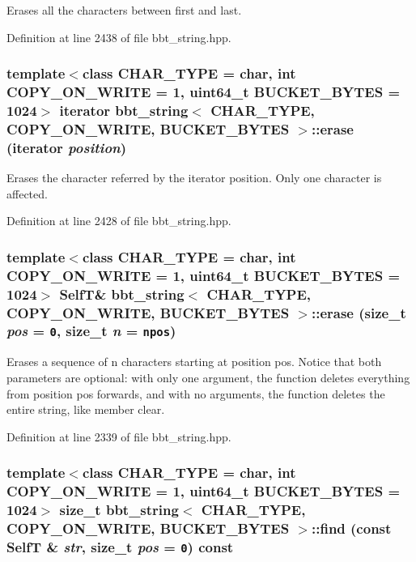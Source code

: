 Erases all the characters between first and last. 

Definition at line 2438 of file bbt\_\-string.hpp.\hypertarget{classbbt__string_5eac694c7f6e44c5018993eba8153e33}{
\subsubsection[{erase}]{\setlength{\rightskip}{0pt plus 5cm}template$<$class CHAR\_\-TYPE  = char, int COPY\_\-ON\_\-WRITE = 1, uint64\_\-t BUCKET\_\-BYTES = 1024$>$ iterator {\bf bbt\_\-string}$<$ CHAR\_\-TYPE, COPY\_\-ON\_\-WRITE, BUCKET\_\-BYTES $>$::erase (iterator {\em position})}}
\label{classbbt__string_5eac694c7f6e44c5018993eba8153e33}


Erases the character referred by the iterator position. Only one character is affected. 

Definition at line 2428 of file bbt\_\-string.hpp.\hypertarget{classbbt__string_21d1419fbc55b6276cb15a62b513106d}{
\subsubsection[{erase}]{\setlength{\rightskip}{0pt plus 5cm}template$<$class CHAR\_\-TYPE  = char, int COPY\_\-ON\_\-WRITE = 1, uint64\_\-t BUCKET\_\-BYTES = 1024$>$ {\bf SelfT}\& {\bf bbt\_\-string}$<$ CHAR\_\-TYPE, COPY\_\-ON\_\-WRITE, BUCKET\_\-BYTES $>$::erase (size\_\-t {\em pos} = {\tt 0}, \/  size\_\-t {\em n} = {\tt npos})}}
\label{classbbt__string_21d1419fbc55b6276cb15a62b513106d}


Erases a sequence of n characters starting at position pos. Notice that both parameters are optional: with only one argument, the function deletes everything from position pos forwards, and with no arguments, the function deletes the entire string, like member clear. 

Definition at line 2339 of file bbt\_\-string.hpp.\hypertarget{classbbt__string_d4e8abb583695fb2be91eaee21827601}{
\subsubsection[{find}]{\setlength{\rightskip}{0pt plus 5cm}template$<$class CHAR\_\-TYPE  = char, int COPY\_\-ON\_\-WRITE = 1, uint64\_\-t BUCKET\_\-BYTES = 1024$>$ size\_\-t {\bf bbt\_\-string}$<$ CHAR\_\-TYPE, COPY\_\-ON\_\-WRITE, BUCKET\_\-BYTES $>$::find (const {\bf SelfT} \& {\em str}, \/  size\_\-t {\em pos} = {\tt 0}) const}}
\label{classbbt__string_d4e8abb583695fb2be91eaee21827601}


